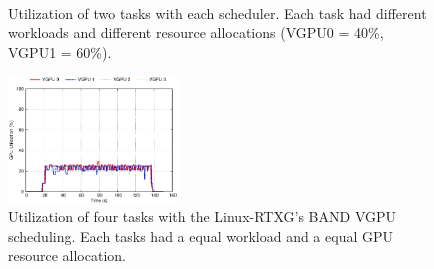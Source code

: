 \begin{figure}[!t]
\begin{minipage}[t]{0.33\hsize}
\begin{center}
\label{fig:band_rtx}
\label{fig:rtx_nouveau}
\end{center}
\end{minipage}
\begin{minipage}[t]{0.33\hsize}
\begin{center}
\label{fig:fifo_gdev} \\
\label{fig:band_gdev}
\label{fig:gdev_usage}
\end{center}
\end{minipage}
\caption{Utilization of two tasks with each scheduler. Each task had different workloads and different resource allocations (VGPU0 = 40\%, VGPU1 = 60\%).}
\label{fig:utilize}
\end{figure}

\begin{figure}[!t]
\begin{center}
\includegraphics[width=0.4\textwidth]{img/band_rtx_fair}
\caption{Utilization of four tasks with the Linux-RTXG's BAND VGPU scheduling. Each tasks had a equal workload and a equal GPU resource allocation.}
\label{fig:band_rtx_fair}
\end{center}
\end{figure}

